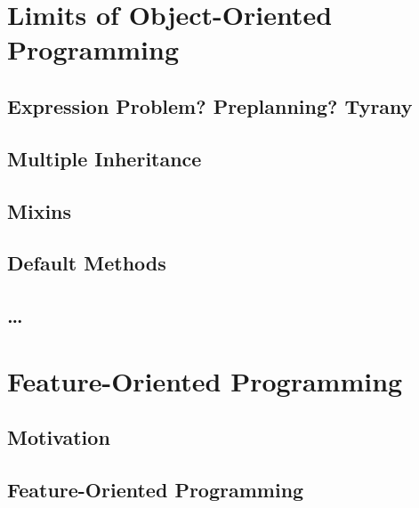 \documentclass[
	aspectratio=169, %
	8pt, %
	handout, %
]{beamer}
\subtitle{7. Languages for Features}
\author{Thomas Thüm}
\begin{document}


\section{Limits of Object-Oriented Programming}

\subsection{Expression Problem? Preplanning? Tyrany}
\subsection{Multiple Inheritance}
\subsection{Mixins}
\subsection{Default Methods}
\subsection{\ldots}

%

\lessonslearned{
	\item \ldots
}{
	\item \ldots
}{
	\ldots
}

\sectionend

\section{Feature-Oriented Programming}

\subsection{Motivation}
\subsection{Feature-Oriented Programming}
\end{document}
